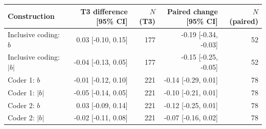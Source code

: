 
\begin{tabular}{lrrrr}
\toprule
Construction & T3 difference [95\% CI] & $N$ (T3) & Paired change [95\% CI] & $N$ (paired)\\
\midrule
Inclusive coding: $b$ & 0.03 [-0.10, 0.15] & 177 & -0.19 [-0.34, -0.03] & 52\\
Inclusive coding: $|b|$ & -0.04 [-0.13, 0.05] & 177 & -0.15 [-0.25, -0.05] & 52\\
Coder 1: $b$ & -0.01 [-0.12, 0.10] & 221 & -0.14 [-0.29, 0.01] & 78\\
Coder 1: $|b|$ & -0.05 [-0.14, 0.05] & 221 & -0.10 [-0.21, 0.01] & 78\\
Coder 2: $b$ & 0.03 [-0.09, 0.14] & 221 & -0.12 [-0.25, 0.01] & 78\\
Coder 2: $|b|$ & -0.02 [-0.11, 0.08] & 221 & -0.07 [-0.16, 0.02] & 78\\
\bottomrule
\end{tabular}
